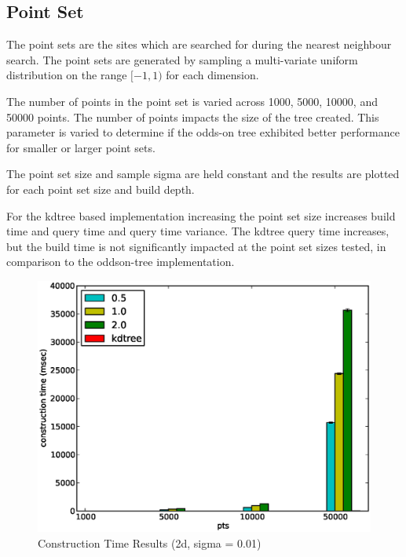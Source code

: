 \documentclass[mcs]{scsthesis}
\begin{document}
\subsection{Point Set}

The point sets are the sites which are searched for during the nearest neighbour
search. The point sets are generated by sampling a multi-variate uniform
distribution on the range \([-1, 1)\) for each dimension.

The number of points in the point set is varied across 1000, 5000, 10000, and
50000 points. The number of points impacts the size of the tree created. This
parameter is varied to determine if the odds-on tree exhibited better
performance for smaller or larger point sets.

The point set size and sample sigma are held constant and the results are
plotted for each point set size and build depth.

For the kdtree based implementation increasing the point set size increases
build time and query time and query time variance. The kdtree query time
increases, but the build time is not significantly impacted at the point set
sizes tested, in comparison to the oddson-tree implementation.

\begin{figure}
\begin{center}
\includegraphics[scale=0.5]{diagrams/2d_group_bypts_sigma0.01_ctime.eps}
\caption{Construction Time Results (2d, sigma = 0.01)}
\end{center}
\end{figure}
\end{document}
